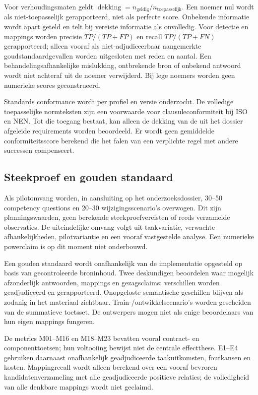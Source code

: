

Voor verhoudingsmaten geldt $\operatorname{dekking}=n_{\mathrm{geldig}}/n_{\mathrm{toepasselijk}}$. Een noemer nul wordt als niet-toepasselijk gerapporteerd, niet als perfecte score. Onbekende informatie wordt apart geteld en telt bij vereiste informatie als onvolledig. Voor detectie en mappings worden precisie $TP/(TP+FP)$ en recall $TP/(TP+FN)$ gerapporteerd; alleen vooraf als niet-adjudiceerbaar aangemerkte goudstandaardgevallen worden uitgesloten met reden en aantal. Een behandelingsafhankelijke mislukking, ontbrekende bron of onbekend antwoord wordt niet achteraf uit de noemer verwijderd. Bij lege noemers worden geen numerieke scores geconstrueerd.

Standards conformance wordt per profiel en versie onderzocht. De volledige toepasselijke normteksten zijn een voorwaarde voor clausuleconformiteit bij ISO en NEN. Tot die toegang bestaat, kan alleen de dekking van de uit het dossier afgeleide requirements worden beoordeeld. Er wordt geen gemiddelde conformiteitsscore berekend die het falen van een verplichte regel met andere successen compenseert.

\subsection{Steekproef en gouden standaard}
Als pilotomvang worden, in aansluiting op het onderzoeksdossier, 30--50 competency questions en 20--30 wijzigingsscenario’s overwogen. Dit zijn planningswaarden, geen berekende steekproefvereisten of reeds verzamelde observaties. De uiteindelijke omvang volgt uit taakvariatie, verwachte afhankelijkheden, pilotvariantie en een vooraf vastgestelde analyse. Een numerieke powerclaim is op dit moment niet onderbouwd.

Een gouden standaard wordt onafhankelijk van de implementatie opgesteld op basis van gecontroleerde broninhoud. Twee deskundigen beoordelen waar mogelijk afzonderlijk antwoorden, mappings en gezagsclaims; verschillen worden geadjudiceerd en gerapporteerd. Onopgeloste semantische geschillen blijven als zodanig in het materiaal zichtbaar. Train-/ontwikkelscenario’s worden gescheiden van de summatieve toetsset. De ontwerpers mogen niet als enige beoordelaars van hun eigen mappings fungeren.

De metrics M01--M16 en M18--M23 bevatten vooral contract- en componenttoetsen; hun voltooiing bewijst niet de centrale effectthese. E1--E4 gebruiken daarnaast onafhankelijk geadjudiceerde taakuitkomsten, foutkansen en kosten. Mappingrecall wordt alleen berekend over een vooraf bevroren kandidatenverzameling met alle geadjudiceerde positieve relaties; de volledigheid van alle denkbare mappings wordt niet geclaimd.

